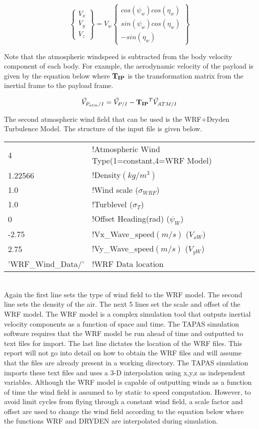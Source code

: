 \documentclass[letterpaper]{article}
\begin{document}
\begin{equation}
\begin{Bmatrix} V_x \\ V_y \\ V_z \end{Bmatrix} = V_w \begin{Bmatrix}
  cos(\psi_w)cos(\eta_w) \\ sin(\psi_w)cos(\eta_w) \\ -sin(\eta_w) \end{Bmatrix}
\end{equation}

Note that the atmospheric windspeed is subtracted from the body
velocity component of each body. For example, the aerodynamic velocity
of the payload is given by the equation below where ${\bf T_{IP}}$ is the
transformation matrix from the inertial frame to the payload frame.

\begin{equation}
\vec{V}_{P_{atm}/I} = \vec{V}_{P/I} - {\bf T_{IP}}^T\vec{V}_{ATM/I}
\end{equation}

The second atmospheric wind field that can be used is the WRF+Dryden
Turbulence Model. The structure of the input file is given below.

{\singlespace
\begin{tabular}{l l l}
4	& !Atmospheric Wind Type(1=constant,4=WRF Model)\\
1.22566 	& !Density$(kg/m^3)$\\
1.0	&!Wind scale ($\sigma_{WRF}$)\\
1.0	& !Turblevel ($\sigma_T$)\\
0	& !Offset Heading(rad) ($\psi_W$) \\
-2.75	& !Vx\_Wave\_speed$(m/s)$ ($V_{xW}$)\\
2.75	& !Vy\_Wave\_speed$(m/s)$ ($V_{yW}$)\\
'WRF\_Wind\_Data/' & !WRF Data location
\end{tabular}
}
\\

Again the first line sets the type of wind field to the WRF model. The
second line sets the density of the air. The next 5 lines set the
scale and offset of the WRF model. The WRF model is a complex
simulation tool that outputs inertial velocity components as a
function of space and time. The TAPAS simulation software requires
that the WRF model be run ahead of time and outputted to text files
for import. The last line dictates the location of the WRF files. This
report will not go into detail on how to obtain the WRF files and will
assume that the files are already present in a working directory. The
TAPAS simulation imports these text files and uses a 3-D interpolation
using x,y,z as independent variables. Although the WRF model is
capable of outputting winds as a function of time the wind field is
assumed to by static to speed computation. However, to avoid limit
cycles from flying through a constant wind field, a scale factor
and offset are used to change the wind field according to the equation
below where the functions WRF and DRYDEN are interpolated during
simulation.
\end{document}

